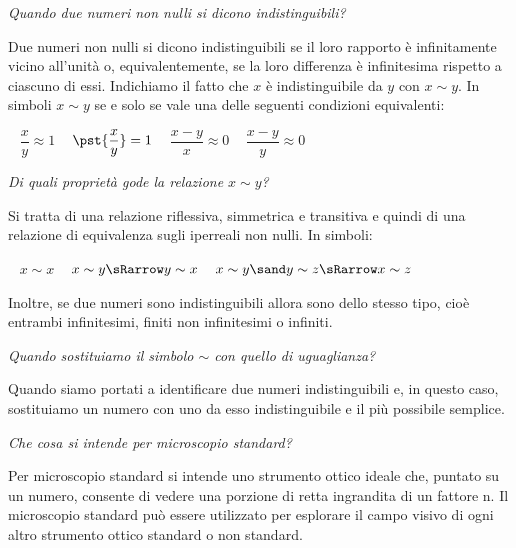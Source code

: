\begin{esercizio}\label{ese:iper_028} 
\emph{Quando due numeri non nulli si dicono indistinguibili?}

Due numeri non nulli si dicono indistinguibili se il loro rapporto è 
infinitamente vicino all'unità o, equivalentemente, se la loro differenza è 
infinitesima rispetto a ciascuno di essi. Indichiamo il fatto che \(x\) è 
indistinguibile da \(y\) con \(x \sim y\). 
In simboli \(x \sim y\) se e solo se vale una 
delle seguenti condizioni equivalenti:
\begin{center}
\textbullet ~ \(\dfrac{x}{y} \approx 1\) \qquad 
\textbullet ~ \(\pst{\dfrac{x}{y}}=1\) \qquad 
\textbullet ~ \(\dfrac{x - y}{x} \approx 0\) \qquad 
\textbullet ~ \(\dfrac{x - y}{y} \approx 0\)
\end{center}

\end{esercizio}

\begin{esercizio}\label{ese:iper_029} 
\emph{Di quali proprietà gode la relazione \(x \sim y\)?}

Si tratta di una relazione riflessiva, simmetrica e transitiva e quindi di 
una relazione di equivalenza sugli iperreali non nulli. In simboli:
\begin{center}
\textbullet ~ \(x \sim x\) \qquad
\textbullet ~ \(x \sim y \sRarrow y \sim x\) \qquad
\textbullet ~ \(x \sim y \sand y \sim z \sRarrow x \sim z\) \qquad
\end{center}
Inoltre, se due numeri sono indistinguibili allora sono dello stesso tipo, 
cioè entrambi infinitesimi, finiti non infinitesimi o infiniti.
\end{esercizio}

\begin{esercizio}\label{ese:iper_030} 
\emph{Quando sostituiamo il simbolo \(\sim\) con quello di uguaglianza?}

Quando siamo portati a identificare due numeri indistinguibili e, in questo 
caso, sostituiamo un numero con uno da esso indistinguibile e il più 
possibile semplice.
\end{esercizio}

\begin{esercizio}\label{ese:iper_031} 
\emph{Che cosa si intende per microscopio standard?}

Per microscopio standard si intende uno strumento ottico ideale che, 
puntato su un numero, consente di vedere una porzione di retta ingrandita di 
un fattore n. 
Il microscopio standard può essere utilizzato per esplorare il campo visivo 
di ogni altro strumento ottico standard o non standard.
\end{esercizio}

